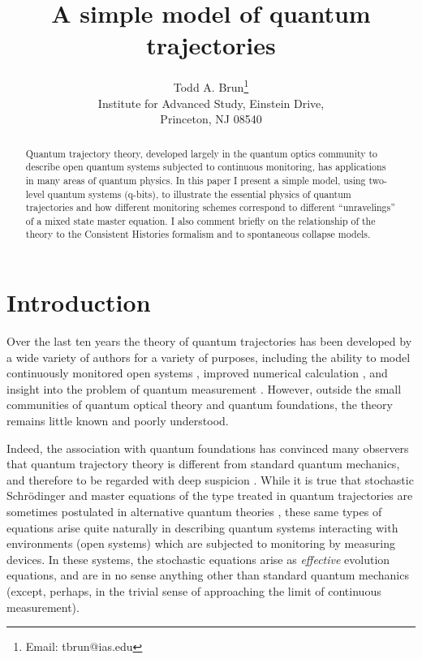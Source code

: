 \documentclass[12pt]{article}
\begin{document}
\title{A simple model of quantum trajectories}

\author{Todd A. Brun\thanks{Email:  tbrun@ias.edu} \\
Institute for Advanced Study, Einstein Drive, \\
Princeton, NJ  08540 }

\maketitle

\begin{abstract}
Quantum trajectory theory, developed largely in the quantum optics
community to describe open quantum systems subjected to continuous
monitoring, has applications in many areas of quantum physics.
In this paper I present a simple model, using two-level quantum
systems (q-bits), to illustrate the essential physics of quantum
trajectories and how different monitoring schemes correspond to different
``unravelings'' of a mixed state master equation.
I also comment briefly on the relationship of the
theory to the Consistent Histories formalism and to spontaneous collapse
models.
\end{abstract}

\section{Introduction}

Over the last ten years the theory of quantum trajectories has been
developed by a wide variety of authors
\cite{Carmichael,Dalibard,Dum,Gardiner,Gisin1,Diosi,Gisin2,Schack}
for a variety of purposes,
including the ability to model continuously monitored open systems
\cite{Carmichael,Dum,Gardiner}, improved numerical calculation
\cite{Dalibard,Schack}, and insight into the problem
of quantum measurement \cite{Gisin1,Diosi,Gisin2}.
However, outside the small communities of quantum optical
theory and quantum foundations, the theory remains little known and
poorly understood.

Indeed, the association with quantum foundations has convinced many
observers that quantum trajectory theory is different from
standard quantum mechanics, and therefore to be regarded with deep
suspicion \cite{Zeh}.  While it is true that stochastic Schr\"odinger
and master equations of the type treated in quantum trajectories
are sometimes postulated in alternative quantum theories
\cite{Pearle,GRW,Percival2,Penrose},
these same types of equations arise quite naturally in describing
quantum systems interacting with environments (open systems)
which are subjected to monitoring by measuring devices.  In these
systems, the stochastic equations arise as {\it effective} evolution
equations, and are in no sense anything other than standard quantum
mechanics (except, perhaps, in the trivial sense of approaching the
limit of continuous measurement).
\end{document}
